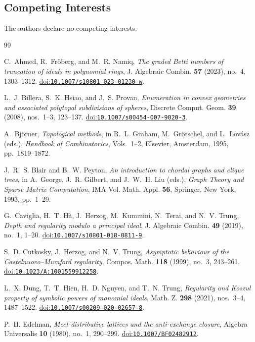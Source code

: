 \documentclass[11pt]{amsart}
\theoremstyle{definition}
\newcommand{\doi}[1]{\href{https://doi.org/#1}{doi:\nolinkurl{#1}}}
\begin{document}
\subsection*{Competing Interests}
The authors declare no competing interests.

\begin{thebibliography}{99}
	
C.~Ahmed, R.~Fr\"oberg, and M.~R. Namiq,
\emph{The graded Betti numbers of truncation of ideals in polynomial rings},
J. Algebraic Combin. \textbf{57} (2023), no.~4, 1303--1312.
\doi{10.1007/s10801-023-01230-w}.
	
L.~J. Billera, S.~K. Hsiao, and J.~S. Provan,
\emph{Enumeration in convex geometries and associated polytopal subdivisions of spheres},
Discrete Comput. Geom. \textbf{39} (2008), nos.~1--3, 123--137.
\doi{10.1007/s00454-007-9020-3}.

A.~Bj\"orner,
\emph{Topological methods},
in R.~L. Graham, M.~Gr\"otschel, and L.~Lov\'asz (eds.),
\emph{Handbook of Combinatorics}, Vols.~1--2,
Elsevier, Amsterdam, 1995, pp.~1819--1872.

J.~R.~S. Blair and B.~W. Peyton,
\emph{An introduction to chordal graphs and clique trees},
in A.~George, J.~R. Gilbert, and J.~W.~H. Liu (eds.),
\emph{Graph Theory and Sparse Matrix Computation},
IMA Vol. Math. Appl. \textbf{56},
Springer, New York, 1993, pp.~1--29.

G.~Caviglia, H.~T. H\`a, J.~Herzog, M.~Kummini, N.~Terai, and N.~V. Trung,
\emph{Depth and regularity modulo a principal ideal},
J. Algebraic Combin. \textbf{49} (2019), no.~1, 1--20.
\doi{10.1007/s10801-018-0811-9}.

S.~D. Cutkosky, J.~Herzog, and N.~V. Trung,
\emph{Asymptotic behaviour of the Castelnuovo--Mumford regularity},
Compos. Math. \textbf{118} (1999), no.~3, 243--261.
\doi{10.1023/A:1001559912258}.

L.~X. Dung, T.~T. Hien, H.~D. Nguyen, and T.~N. Trung,
\emph{Regularity and Koszul property of symbolic powers of monomial ideals},
Math. Z. \textbf{298} (2021), nos.~3--4, 1487--1522.
\doi{10.1007/s00209-020-02657-8}.

P.~H. Edelman,
\emph{Meet-distributive lattices and the anti-exchange closure},
Algebra Universalis \textbf{10} (1980), no.~1, 290--299.
\doi{10.1007/BF02482912}.


\end{thebibliography}
\end{document}
